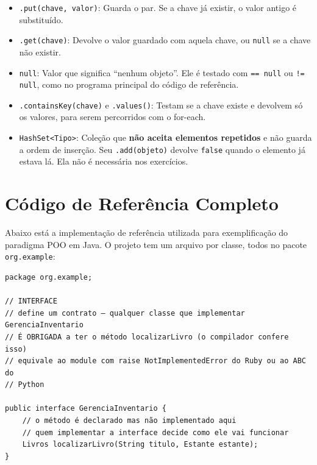 \begin{itemize}
    \item \texttt{.put(chave, valor)}: Guarda o par. Se a chave já existir, o valor antigo é
    substituído.

    \item \texttt{.get(chave)}: Devolve o valor guardado com aquela chave, ou \texttt{null} se a
    chave não existir.

    \item \texttt{null}: Valor que significa ``nenhum objeto''. Ele é testado com
    \texttt{== null} ou \texttt{!= null}, como no programa principal do código de referência.

    \item \texttt{.containsKey(chave)} e \texttt{.values()}: Testam se a chave existe e
    devolvem só os valores, para serem percorridos com o for-each.

    \item \texttt{HashSet<Tipo>}: Coleção que \textbf{não aceita elementos repetidos} e não
    guarda a ordem de inserção. Seu \texttt{.add(objeto)} devolve \texttt{false} quando o
    elemento já estava lá. Ela não é necessária nos exercícios.
\end{itemize}

\section{Código de Referência Completo}

Abaixo está a implementação de referência utilizada para exemplificação do paradigma POO em
Java. O projeto tem um arquivo por classe, todos no pacote \texttt{org.example}:

\begin{lstlisting}[style=java, caption={Exemplo de Aplicação de POO em Java: \texttt{GerenciaInventario.java}}]
package org.example;

// INTERFACE
// define um contrato — qualquer classe que implementar GerenciaInventario
// É OBRIGADA a ter o método localizarLivro (o compilador confere isso)
// equivale ao module com raise NotImplementedError do Ruby ou ao ABC do
// Python

public interface GerenciaInventario {
    // o método é declarado mas não implementado aqui
    // quem implementar a interface decide como ele vai funcionar
    Livros localizarLivro(String titulo, Estante estante);
}
\end{lstlisting}

